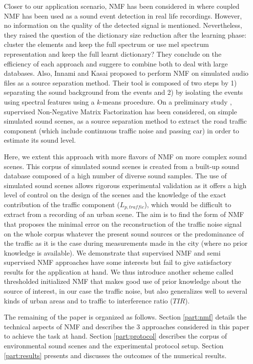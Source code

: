 \documentclass[twocolumn]{svjour3}          %
\begin{document}
Closer to our application scenario, NMF has been considered in \cite{mesaros_sound_2015} where coupled NMF has been used as a sound event detection in real life recordings. However, no information on the quality of the detected signal is mentioned. Nevertheless, they raised the question of the dictionary size reduction after the learning phase: cluster the elements and keep the full spectrum or use mel spectrum representation and keep the full learnt dictionary? They conclude on the efficiency of each approach and suggere to combine both to deal with large databases. Also, Innami and Kasai \cite{satoshi_innami_nmf-based_2012} proposed to perform NMF on simulated audio files as a source separation method. Their tool is composed of two steps by 1) separating the sound background from the events and 2) by isolating the events using spectral features using a $k$-means procedure. 
On a preliminary study \cite{gloaguen2016estimating}, supervised Non-Negative Matrix Factorization has been considered, on simple simulated sound scenes, as a source separation method to extract the road traffic component (which include continuous traffic noise and passing car) in order to estimate its sound level. 

Here, we extent this approach with more flavors of NMF on more complex sound scenes. This corpus of simulated sound scenes is created from a built-up sound database composed of a high number of diverse sound samples. The use of simulated sound scenes allows rigorous experimental validation as it offers a high level of control on the design of the scenes and the knowledge of the exact contribution of the traffic component ($L_{p,traffic}$), which would be difficult to extract from a recording of an urban scene. 
The aim is to find the form of NMF that proposes the minimal error on the reconstruction of the traffic noise signal on the whole corpus whatever the present sound sources or the predominance of the traffic as it is the case during measurements made in the city (where no prior knowledge is available).
We demonstrate that supervised NMF and semi supervised NMF approaches have some interests but fail to give satisfactory results for the application at hand. We thus introduce another scheme called thresholded initialized NMF that makes good use of prior knowledge about the source of interest, in our case the traffic noise, but also generalizes well to several kinds of urban areas and to traffic to interference ratio ($TIR$).

The remaining of the paper is organized as follows. Section \ref{part:nmf} details the technical aspects of NMF and describes the 3 approaches considered in this paper to achieve the task at hand. Section \ref{part:protocol} describes the corpus of environmental sound scenes and the experimental protocol setup. Section \ref{part:results} presents and discusses the outcomes of the numerical results.
\end{document}
